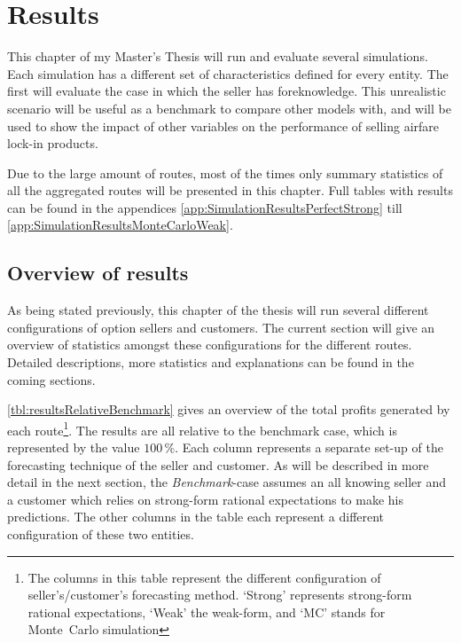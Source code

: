 \chapter{Results}
\label{chap:Results}
This chapter of my Master's Thesis will run and evaluate several simulations. Each simulation has a different set of characteristics defined for every entity. The first will evaluate the case in which the seller has foreknowledge. This unrealistic scenario will be useful as a benchmark to compare other models with, and will be used to show the impact of other variables on the performance of selling airfare lock-in products.

Due to the large amount of routes, most of the times only summary statistics of all the aggregated routes will be presented in this chapter. Full tables with results can be found in the appendices \ref{app:SimulationResultsPerfectStrong} till \ref{app:SimulationResultsMonteCarloWeak}.



\section{Overview of results}
As being stated previously, this chapter of the thesis will run several different configurations of option sellers and customers. The current section will give an overview of statistics amongst these configurations for the different routes. Detailed descriptions, more statistics and explanations can be found in the coming sections.

\autoref{tbl:resultsRelativeBenchmark} gives an overview of the total profits generated by each route\footnote{The columns in this table represent the different configuration of seller's/customer's forecasting method. `Strong' represents strong-form rational expectations, `Weak' the weak-form, and `MC' stands for Monte~Carlo simulation}. The results are all relative to the benchmark case, which is represented by the value $100\,\%$. Each column represents a separate set-up of the forecasting technique of the seller and customer. As will be described in more detail in the next section, the \emph{Benchmark}-case assumes an all knowing seller and a customer which relies on strong-form rational expectations to make his predictions. The other columns in the table each represent a different configuration of these two entities.

